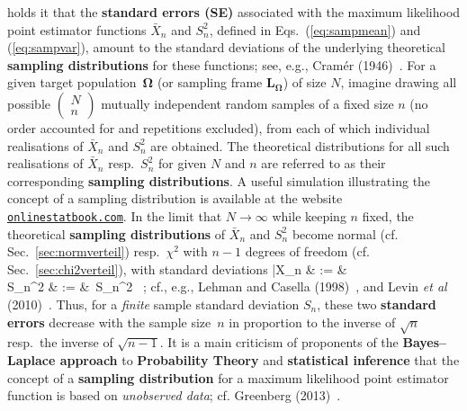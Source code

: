 holds it that the \textbf{standard errors (SE)} associated with the 
maximum likelihood point estimator functions $\bar{X}_{n}$ and 
$S_{n}^{2}$, defined in Eqs.~(\ref{eq:sampmean}) and 
(\ref{eq:sampvar}), amount to the standard deviations of the 
underlying theoretical \textbf{sampling distributions} for these 
functions; see, e.g., Cram\'{e}r (1946)~. For a given target population~$\boldsymbol{\Omega}$ 
(or sampling frame $\boldsymbol{L_{\Omega}}$) of size $N$, imagine 
drawing all possible $\left(\begin{array}{c} N \\ n 
\end{array}\right)$ mutually independent random samples of a fixed 
size $n$ (no order accounted for and repetitions excluded), from 
each of which individual realisations of $\bar{X}_{n}$ and 
$S_{n}^{2}$ are obtained. The theoretical distributions 
for all such realisations of $\bar{X}_{n}$ resp.~$S_{n}^{2}$ for 
given $N$ and $n$ are referred to as their corresponding
\textbf{sampling distributions}. A useful simulation illustrating
the concept of a sampling distribution is available at the website 
\href{http://onlinestatbook.com/stat_sim/sampling_dist/index.html}
{\texttt{onlinestatbook.com}}. In the limit that $N \to \infty$
while keeping $n$ fixed, the theoretical \textbf{sampling
distributions} of $\bar{X}_{n}$ and $S_{n}^{2}$ become normal (cf. 
Sec.~\ref{sec:normverteil}) resp.~$\chi^{2}$ with $n-1$ degrees of 
freedom (cf. Sec.~\ref{sec:chi2verteil}), with standard deviations
%
\bea
{}
\bar{X}_{n} & := &  \\
%
S_{n}^{2} & := & \,S_{n}^{2} \ ;
\eea
%
cf., e.g., Lehman and Casella (1998)~,
and Levin \textit{et al} (2010)~. 
Thus, for a \textit{finite} sample standard deviation $S_{n}$, 
these two \textbf{standard errors} decrease with the sample 
size~$n$ in proportion to the inverse of $\sqrt{n}$ resp.~the 
inverse of $\sqrt{n-1}$. It is a main criticism of proponents of 
the \textbf{Bayes--Laplace approach} to \textbf{Probability Theory}
and \textbf{statistical inference} that the concept of a
\textbf{sampling distribution} for a maximum likelihood point
estimator function is based on \textit{unobserved data}; cf.
Greenberg (2013)~.

